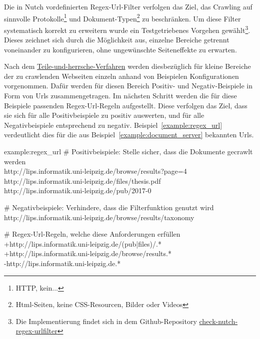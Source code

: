 Die in Nutch vordefinierten Regex-Url-Filter verfolgen das Ziel,
das Crawling auf sinnvolle Protokolle\footnote{HTTP, kein...} und Dokument-Typen\footnote{Html-Seiten, keine CSS-Resourcen, Bilder oder Videos} zu beschränken.
Um diese Filter systematisch korrekt zu erweitern wurde ein
Testgetriebenes Vorgehen gewählt\footnote{Die Implementierung findet
sich in dem Github-Repository \href{https://github.com/mam10eks/check-nutch-regex-urlfilter}{check-nutch-regex-urlfilter}}.
Dieses zeichnet sich durch die Möglichkeit aus, einzelne Bereiche getrennt voneinander zu konfigurieren, ohne ungewünschte Seiteneffekte zu erwarten.

Nach dem \href{https://de.wikipedia.org/wiki/Teile-und-herrsche-Verfahren}{Teile-und-herrsche-Verfahren} werden
diesbezüglich für kleine Bereiche der zu crawlenden Webseiten einzeln anhand von Beispielen Konfigurationen vorgenommen.
Dafür werden für diesen Bereich Positiv- und Negativ-Beispiele in Form von Urls zusammengetragen.
Im nächsten Schritt werden die für diese Beispiele passenden Regex-Url-Regeln aufgestellt.
Diese verfolgen das Ziel, dass sie sich für alle Positivbeispiele zu positiv auswerten, und für alle Negativbeispiele entsprechend zu negativ.
Beispiel~\ref{example:regex_url} verdeutlicht dies für die aus Beispiel~\ref{example:document_server} bekannten Urls.

\begin{example}{example:regex_url}
\# Positivbeispiele: Stelle sicher, dass die Dokumente gecrawlt werden\\
http://lips.informatik.uni-leipzig.de/browse/results?page=4\\
http://lips.informatik.uni-leipzig.de/files/thesis.pdf\\
http://lips.informatik.uni-leipzig.de/pub/2017-0

\# Negativbeispiele: Verhindere, dass die Filterfunktion genutzt wird\\
http://lips.informatik.uni-leipzig.de/browse/results/taxonomy%

\# Regex-Url-Regeln, welche diese Anforderungen erfüllen\\
+http://lips.informatik.uni-leipzig.de/(pub|files)/.*\\
+http://lips.informatik.uni-leipzig.de/browse/results.*\\
-http://lips.informatik.uni-leipzig.de.*\\
\end{example}

